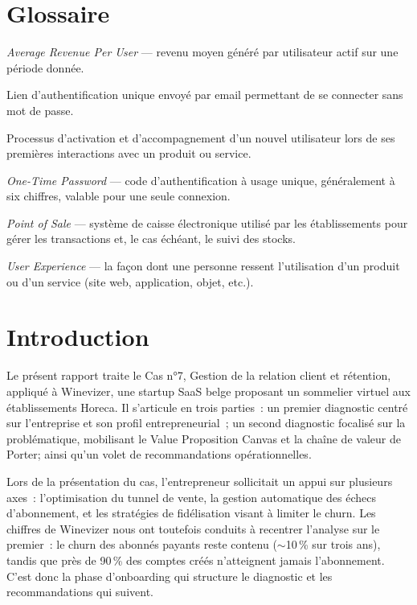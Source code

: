 \documentclass[12pt, a4paper]{article}
\begin{document}
\pagestyle{empty}


\newpage
\tableofcontents

\newpage
\setcounter{page}{1}
\pagestyle{fancy}
\section*{Glossaire}

\begin{description}[leftmargin=4.5cm, style=sameline, font=\normalfont\bfseries]
  \item[ARPU] \textit{Average Revenue Per User} — revenu moyen généré par utilisateur actif sur une période donnée.
  \item[Magic link] Lien d'authentification unique envoyé par email permettant de se connecter sans mot de passe.
  \item[Onboarding] Processus d'activation et d'accompagnement d'un nouvel utilisateur lors de ses premières interactions avec un produit ou service.
  \item[OTP] \textit{One-Time Password} — code d'authentification à usage unique, généralement à six chiffres, valable pour une seule connexion.
  \item[POS] \textit{Point of Sale} — système de caisse électronique utilisé par les établissements pour gérer les transactions et, le cas échéant, le suivi des stocks.
  \item[UX] \textit{User Experience} — la façon dont une personne ressent l'utilisation d'un produit ou d'un service (site web, application, objet, etc.).
\end{description}

\newpage

\section{Introduction}

Le présent rapport traite le Cas n°7, Gestion de la relation client et rétention, appliqué à
Winevizer, une startup SaaS belge proposant un sommelier virtuel aux établissements Horeca.
Il s'articule en trois parties~: un premier diagnostic centré sur l'entreprise et son profil
entrepreneurial~; un second diagnostic focalisé sur la problématique, mobilisant
le Value Proposition Canvas et la chaîne de valeur de Porter; ainsi qu'un
volet de recommandations opérationnelles.

Lors de la présentation du cas, l'entrepreneur sollicitait un appui sur plusieurs axes~:
l'optimisation du tunnel de vente, la gestion automatique des échecs d'abonnement, et les
stratégies de fidélisation visant à limiter le churn. Les chiffres de Winevizer nous ont
toutefois conduits à recentrer l'analyse sur le premier~: le churn des abonnés payants reste
contenu ($\sim$10\,\% sur trois ans), tandis que près de 90\,\% des comptes créés n'atteignent
jamais l'abonnement. C'est donc la phase d'onboarding qui structure le diagnostic et les
recommandations qui suivent.
\end{document}
